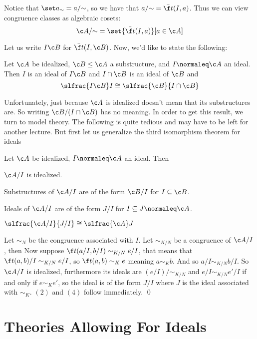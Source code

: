 Notice that $\set a_\sim=a/{\sim}$, so we have that $a/{\sim}=\bar{\f t}(I,a)$.
Thus we can view congruence classes as algebraic cosets:
$$ \c A/{\sim} = \set{\bar{\f t}(I,a)}[a\in\c A] $$

Let us write $I\c B$ for $\bar{\f t}(I,\c B)$.
Now, we'd like to state the following:

\bthrm[title=The Idealized Second Isomorphism Theorem]

    Let $\c A$ be idealized, $\c B\leq\c A$ a substructure, and $I\normaleq\c A$ an ideal.
    Then $I$ is an ideal of $I\c B$ and $I\cap\c B$ is an ideal of $\c B$ and
    $$ \slfrac{I\c B}I \cong \slfrac{\c B}{I\cap\c B} $$

\ethrm

Unfortunately, just because $\c A$ is idealized doesn't mean that its substructures are.
So writing $\c B/(I\cap\c B)$ has no meaning.
In order to get this result, we turn to model theory.
The following is quite tedious and may have to be left for another lecture.
But first let us generalize the third isomorphism theorem for ideals

\bthrm[title=The Idealized Third Isomorphism Theorem]

    Let $\c A$ be idealized, $I\normaleq\c A$ an ideal.
    Then
    \benum
        \item $\c A/I$ is idealized.
        \item Substructures of $\c A/I$ are of the form $\c B/I$ for $I\subseteq\c B$.
        \item Ideals of $\c A/I$ are of the form $J/I$ for $I\subseteq J\normaleq\c A$.
        \item $\slfrac{\c A/I}{J/I}\cong\slfrac{\c A}J$
    \eenum

\ethrm

\Proof Let $\sim_N$ be the congruence associated with $I$.
Let $\sim_{K/N}$ be a congruence of $\c A/I$, then
Now suppose $\f t(a/I,b/I)\sim_{K/N} e/I$, that means that $\f t(a,b)/I\sim_{K/N} e/I$, so $\f t(a,b)\sim_Ke$ meaning $a\sim_Kb$.
And so $a/I\sim_{K/N} b/I$.
So $\c A/I$ is idealized, furthermore its ideals are $(e/I)/{\sim_{K/N}}$ and $e/I\sim_{K/N}e'/I$ if and only if $e\sim_Ke'$, so the ideal is of the form $J/I$ where $J$ is the ideal associated with
$\sim_K$.
$(2)$ and $(4)$ follow immediately.
\qed

\section{Theories Allowing For Ideals}

